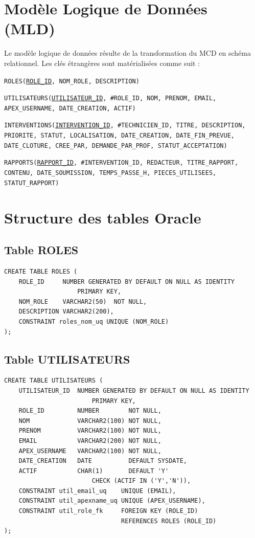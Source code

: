 \documentclass[12pt,a4paper,oneside]{report}
\begin{document}
\section{Modèle Logique de Données (MLD)}

Le modèle logique de données résulte de la transformation du MCD en schéma relationnel. Les clés étrangères sont matérialisées comme suit :

\medskip
\texttt{ROLES(\underline{ROLE\_ID}, NOM\_ROLE, DESCRIPTION)}

\medskip
\texttt{UTILISATEURS(\underline{UTILISATEUR\_ID}, \#ROLE\_ID, NOM, PRENOM, EMAIL, APEX\_USERNAME, DATE\_CREATION, ACTIF)}

\medskip
\texttt{INTERVENTIONS(\underline{INTERVENTION\_ID}, \#TECHNICIEN\_ID, TITRE, DESCRIPTION, PRIORITE, STATUT, LOCALISATION, DATE\_CREATION, DATE\_FIN\_PREVUE, DATE\_CLOTURE, CREE\_PAR, DEMANDE\_PAR\_PROF, STATUT\_ACCEPTATION)}

\medskip
\texttt{RAPPORTS(\underline{RAPPORT\_ID}, \#INTERVENTION\_ID, REDACTEUR, TITRE\_RAPPORT, CONTENU, DATE\_SOUMISSION, TEMPS\_PASSE\_H, PIECES\_UTILISEES, STATUT\_RAPPORT)}

\section{Structure des tables Oracle}

\subsection{Table ROLES}

\begin{lstlisting}[language=PLSQL, caption=Création de la table ROLES]
CREATE TABLE ROLES (
    ROLE_ID     NUMBER GENERATED BY DEFAULT ON NULL AS IDENTITY
                    PRIMARY KEY,
    NOM_ROLE    VARCHAR2(50)  NOT NULL,
    DESCRIPTION VARCHAR2(200),
    CONSTRAINT roles_nom_uq UNIQUE (NOM_ROLE)
);
\end{lstlisting}

\subsection{Table UTILISATEURS}

\begin{lstlisting}[language=PLSQL, caption=Création de la table UTILISATEURS]
CREATE TABLE UTILISATEURS (
    UTILISATEUR_ID  NUMBER GENERATED BY DEFAULT ON NULL AS IDENTITY
                        PRIMARY KEY,
    ROLE_ID         NUMBER        NOT NULL,
    NOM             VARCHAR2(100) NOT NULL,
    PRENOM          VARCHAR2(100) NOT NULL,
    EMAIL           VARCHAR2(200) NOT NULL,
    APEX_USERNAME   VARCHAR2(100) NOT NULL,
    DATE_CREATION   DATE          DEFAULT SYSDATE,
    ACTIF           CHAR(1)       DEFAULT 'Y'
                        CHECK (ACTIF IN ('Y','N')),
    CONSTRAINT util_email_uq    UNIQUE (EMAIL),
    CONSTRAINT util_apexname_uq UNIQUE (APEX_USERNAME),
    CONSTRAINT util_role_fk     FOREIGN KEY (ROLE_ID)
                                REFERENCES ROLES (ROLE_ID)
);
\end{lstlisting}
\end{document}
